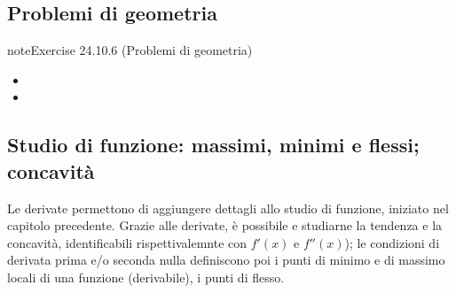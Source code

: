 \documentclass[letterpaper,10pt,italian]{jupyterBook}
\begin{document}
\subsection{Problemi di geometria}
\label{\detokenize{ch/infinitesimal_calculus/derivatives-problems:problemi-di-geometria}}\label{\detokenize{ch/infinitesimal_calculus/derivatives-problems:infinitesimal-calculus-derivatives-problems-geom}} \label{exercise:ch/infinitesimal_calculus/derivatives-problems-exercise-5}

\begin{sphinxadmonition}{note}{Exercise 24.10.6 (Problemi di geometria)}



\sphinxAtStartPar
{}
\begin{itemize}
\item {} 
\sphinxAtStartPar
{}

\item {} 
\sphinxAtStartPar
{}

\end{itemize}
\end{sphinxadmonition}


\subsection{Studio di funzione: massimi, minimi e flessi; concavità}
\label{\detokenize{ch/infinitesimal_calculus/derivatives-problems:studio-di-funzione-massimi-minimi-e-flessi-concavita}}\label{\detokenize{ch/infinitesimal_calculus/derivatives-problems:infinitesimal-calculus-derivatives-problems-fun}}
\sphinxAtStartPar
Le derivate permettono di aggiungere dettagli allo studio di funzione, iniziato nel capitolo precedente. Grazie alle derivate, è possibile e studiarne la tendenza e la concavità, identificabili rispettivalemnte con \(f'(x)\) e \(f''(x)\)); le condizioni di derivata prima e/o seconda nulla definiscono poi i punti di minimo e di massimo locali di una funzione (derivabile), i punti di flesso.
 \label{exercise:ch/infinitesimal_calculus/derivatives-problems-exercise-6}
\end{document}
